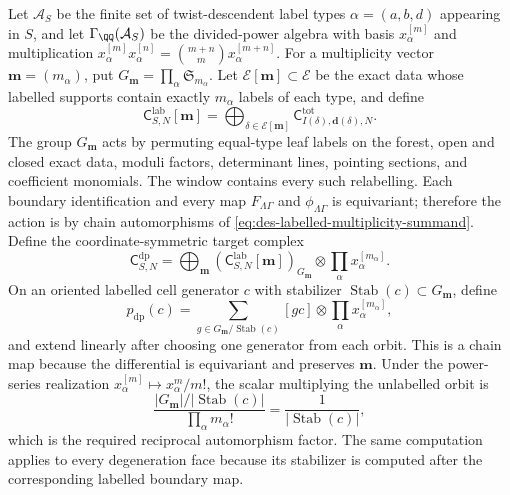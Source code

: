 Let $\mathcal A_S$ be the finite set of twist-descendent label types
$\alpha=(a,b,d)$ appearing in $S$, and let $\Gamma_{\QQ}(\mathcal A_S)$ be
the divided-power algebra with basis $x_\alpha^{[m]}$ and multiplication
$x_\alpha^{[m]}x_\alpha^{[n]}
=\binom{m+n}{m}x_\alpha^{[m+n]}$.  For a multiplicity vector
$\mathbf m=(m_\alpha)$, put
$G_{\mathbf m}=\prod_\alpha\mathfrak S_{m_\alpha}$.  Let
$\mathcal E[\mathbf m]\subset\mathcal E$ be the exact data whose labelled
supports contain exactly $m_\alpha$ labels of each type, and define
\begin{equation}
 \mathsf C^{\mathrm{lab}}_{S,N}[\mathbf m]
 =\bigoplus_{\delta\in\mathcal E[\mathbf m]}
   \mathsf C^{\mathrm{tot}}_{I(\delta),\mathbf d(\delta),N}.
 \label{eq:des-labelled-multiplicity-summand}
\end{equation}
The group $G_{\mathbf m}$ acts by permuting equal-type leaf labels on the
forest, open and closed exact data, moduli factors, determinant lines,
pointing sections, and coefficient monomials.  The window contains every
such relabelling.  Each boundary identification and every map
$F_{\Lambda\Gamma}$ and $\phi_{\Lambda\Gamma}$ is equivariant; therefore
the action is by chain automorphisms of
\eqref{eq:des-labelled-multiplicity-summand}.  Define the
coordinate-symmetric target complex
\begin{equation}
 \mathsf C^{\mathrm{dp}}_{S,N}
 =\bigoplus_{\mathbf m}
   (\mathsf C^{\mathrm{lab}}_{S,N}[\mathbf m])_{G_{\mathbf m}}
   \otimes\prod_\alpha x_\alpha^{[m_\alpha]}.
 \label{eq:des-divided-power}
\end{equation}
On an oriented labelled cell generator $c$ with stabilizer
$\operatorname{Stab}(c)\subset G_{\mathbf m}$, define
\begin{equation}
 p_{\mathrm{dp}}(c)
 =\sum_{g\in G_{\mathbf m}/\operatorname{Stab}(c)}[gc]
   \otimes\prod_\alpha x_\alpha^{[m_\alpha]},
 \label{eq:des-dp-pushforward}
\end{equation}
and extend linearly after choosing one generator from each orbit.  This is a
chain map because the differential is equivariant and preserves
$\mathbf m$.  Under the power-series realization
$x_\alpha^{[m]}\mapsto x_\alpha^m/m!$, the scalar multiplying the unlabelled
orbit is
\begin{equation}
 \frac{|G_{\mathbf m}|/|\operatorname{Stab}(c)|}
      {\prod_\alpha m_\alpha!}
 =\frac1{|\operatorname{Stab}(c)|},
 \label{eq:des-orbit-stabilizer-factor}
\end{equation}
which is the required reciprocal automorphism factor.  The same computation
applies to every degeneration face because its stabilizer is computed after
the corresponding labelled boundary map.

